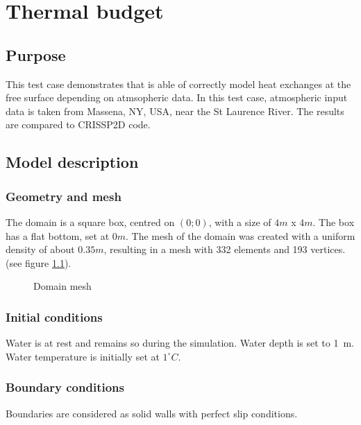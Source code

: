 \renewcommand{\labelitemi}{$\triangleright$}

\chapter{Thermal budget}
%
%
\section{Purpose}
This test case demonstrates that \khione is able of correctly model heat exchanges at the free surface depending on atmsopheric data. In this test case, atmospheric input data is taken from Massena, NY, USA, near the St Laurence River. The results are compared to CRISSP2D code.

\section{Model description}
    
\subsection{Geometry and mesh}
The domain is a square box, centred on $(0;0)$, with a size of $4m$ x $4m$. The box has a flat bottom, set at 
$0m$. The mesh of the domain was created with a uniform density of about $0.35m$, resulting in a mesh with 332 
elements and 193 vertices. (see figure \ref{fig:thermal_mesh}).

\begin{figure}[H]
    \begin{center}
    \end{center}
    \caption{Domain mesh}
    \label{fig:thermal_mesh}
\end{figure}


\subsection{Initial conditions}
Water is at rest and remains so during the simulation. Water depth is set to 1~m.
Water temperature is initially set at $1^\circ C$.

\subsection{Boundary conditions}
Boundaries are considered as solid walls with perfect slip conditions.

